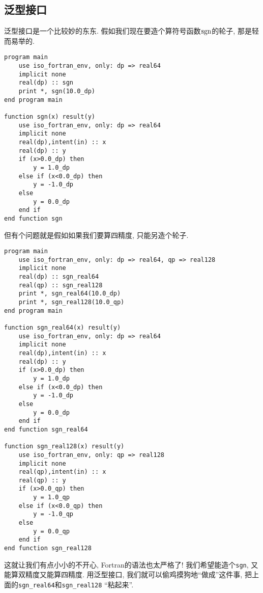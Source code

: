 \subsection{泛型接口}

泛型接口是一个比较妙的东东. 假如我们现在要造个算符号函数$\operatorname{sgn}$的轮子, 那是轻而易举的.
\begin{lstlisting}
program main
    use iso_fortran_env, only: dp => real64
    implicit none
    real(dp) :: sgn
    print *, sgn(10.0_dp)
end program main

function sgn(x) result(y)
    use iso_fortran_env, only: dp => real64
    implicit none
    real(dp),intent(in) :: x
    real(dp) :: y
    if (x>0.0_dp) then
        y = 1.0_dp
    else if (x<0.0_dp) then
        y = -1.0_dp
    else
        y = 0.0_dp
    end if
end function sgn
\end{lstlisting}
但有个问题就是假如如果我们要算四精度, 只能另造个轮子.
\begin{lstlisting}
program main
    use iso_fortran_env, only: dp => real64, qp => real128
    implicit none
    real(dp) :: sgn_real64
    real(qp) :: sgn_real128
    print *, sgn_real64(10.0_dp)
    print *, sgn_real128(10.0_qp)
end program main

function sgn_real64(x) result(y)
    use iso_fortran_env, only: dp => real64
    implicit none
    real(dp),intent(in) :: x
    real(dp) :: y
    if (x>0.0_dp) then
        y = 1.0_dp
    else if (x<0.0_dp) then
        y = -1.0_dp
    else
        y = 0.0_dp
    end if
end function sgn_real64

function sgn_real128(x) result(y)
    use iso_fortran_env, only: qp => real128
    implicit none
    real(qp),intent(in) :: x
    real(qp) :: y
    if (x>0.0_qp) then
        y = 1.0_qp
    else if (x<0.0_qp) then
        y = -1.0_qp
    else
        y = 0.0_qp
    end if
end function sgn_real128
\end{lstlisting}
这就让我们有点小小的不开心, Fortran的语法也太严格了! 我们希望能造个\texttt{sgn}, 又能算双精度又能算四精度. 用泛型接口, 我们就可以偷鸡摸狗地``做成''这件事, 把上面的\texttt{sgn\_{}real64}和\texttt{sgn\_{}real128} ``粘起来''.
